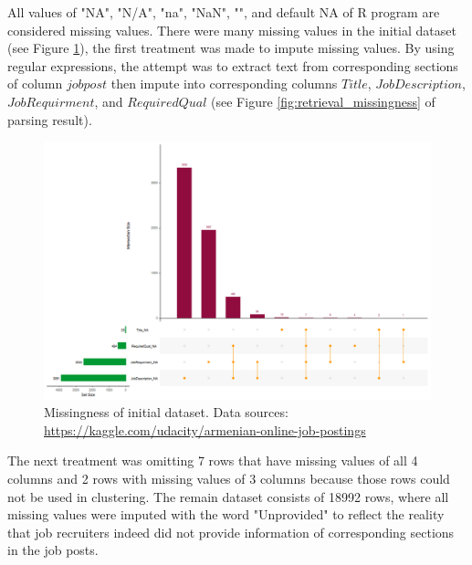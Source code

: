 \documentclass[a4paper,man,floatsintext,natbib,noextraspace]{apa6}
\begin{document}
All values of "NA", "N/A", "na", "NaN", "", and default NA of R program are considered missing values. There were many missing values in the initial dataset (see Figure \ref{fig:initial_missingness}), the first treatment was made to impute missing values. By using regular expressions, the attempt was to extract text from corresponding sections of column $jobpost$ then impute into corresponding columns $Title$, $JobDescription$, $JobRequirment$, and $RequiredQual$ (see Figure \ref{fig:retrieval_missingness} of parsing result). 

\begin{figure}[!htbp]
    \centering
    \includegraphics[width=\textwidth]{initial_missingness.png}
    \caption[Missingness of initial dataset]{Missingness of initial dataset. Data sources: \url{https://kaggle.com/udacity/armenian-online-job-postings}}
    \label{fig:initial_missingness}
\end{figure}

The next treatment was omitting 7 rows that have missing values of all 4 columns and 2 rows with  missing values of 3 columns because those rows could not be used in clustering. The remain dataset consists of 18992 rows, where all missing values were imputed with the word "Unprovided" to reflect the reality that job recruiters indeed did not provide information of corresponding sections in the job posts.
\end{document}
